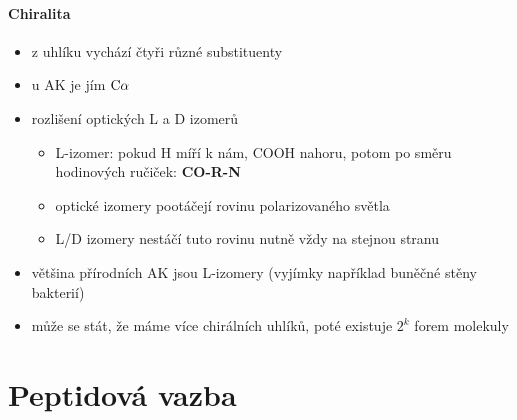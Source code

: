 \documentclass[DIV=8]{scrreprt}
\begin{document}
\paragraph{Chiralita}
\begin{itemize}[nosep]
    \item z uhlíku vychází čtyři různé substituenty
    \item u AK je jím \(\ce{C\alpha}\)
    \item rozlišení optických L a D izomerů
\begin{itemize}[nosep]
    \item L-izomer: pokud H míří k nám, COOH nahoru, potom po směru hodinových ručiček: \textbf{CO-R-N}
    \item optické izomery pootáčejí rovinu polarizovaného světla
    \item L/D izomery nestáčí tuto rovinu nutně vždy na stejnou stranu
\end{itemize}

    \item většina přírodních AK jsou L-izomery (vyjímky například buněčné stěny bakterií)
    \item může se stát, že máme více chirálních uhlíků, poté existuje \(2^k\) forem molekuly
\end{itemize}



\section{Peptidová vazba} \label{Peptidová vazba}
\end{document}
